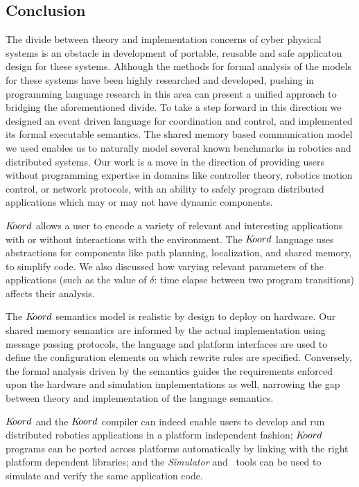 \subsection{Conclusion}
\label{sec:conclusion}


The divide between theory and implementation concerns of cyber physical systems is an obstacle in development of portable, reusable and safe applicaton design for these systems. Although the methods for formal analysis of the models for these systems have been highly researched and developed, pushing in programming language research in this area can present a unified approach to bridging the aforementioned divide. 
To take a step forward in this direction we designed an event driven language for coordination and control, and implemented its formal executable semantics. The shared memory based communication model we used enables us to naturally model several known benchmarks in robotics and distributed systems. Our work is a move in the direction of providing users without programming expertise in domains like controller theory, robotics motion control, or network protocols, with an ability to safely program distributed applications which may or may not have dynamic components. 

 $K\kern-2pt oord$ allows a user to encode a variety of relevant and interesting applications with or without interactions with the environment. The $K\kern-2pt oord$ language uses abstractions for components like path planning, localization, and shared memory, to simplify code. We also discussed how varying relevant parameters of the applications (such as the value of $\delta$: time elapse between two program transitions) affects their analysis.

The $K\kern-2pt oord$ semantics model is realistic by design to deploy on hardware. Our shared memory semantics are informed by the actual implementation using message passing protocols, the language and platform interfaces are used to define the configuration elements on which rewrite rules are specified. Conversely, the formal analysis driven by the semantics guides the requirements enforced upon the hardware and simulation implementations as well, narrowing the gap between theory and implementation of the language semantics. 

 $K\kern-2pt oord$ and the $K\kern-2pt oord$ compiler can indeed enable users to develop and run distributed robotics applications in a platform independent fashion; $K\kern-2pt oord$ programs can be ported across platforms automatically by linking with the right platform dependent libraries; and the \emph{Simulator} and \kbmc\ tools can be used to simulate and verify the same application code. 
